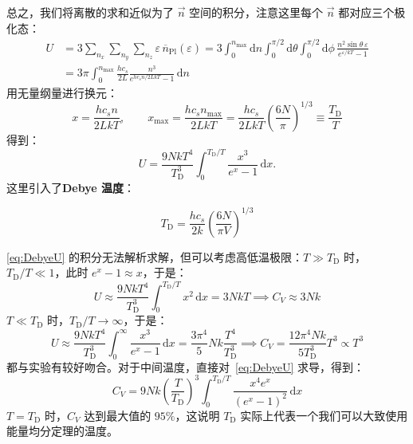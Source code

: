 总之，我们将离散的求和近似为了 $\vec n$ 空间的积分，注意这里每个 $\vec n$ 都对应三个极化态：
\begin{equation}
\begin{split}
    U
    &=3\sum_{n_x}\sum_{n_y}\sum_{n_z}\varepsilon\,\overline n_{\mathrm{Pl}}(\varepsilon)
    =3\int_0^{n_{\max}}\mathrm{d}n\int_0^{\pi/2}\mathrm{d}\theta\int_0^{\pi/2}\mathrm{d}\phi\,\frac{n^2\sin\theta\,\varepsilon}{e^{\varepsilon/kT}-1}\\
    &=3\pi\int_0^{n_{\max}}\frac{hc_s}{2L}\frac{n^3}{e^{hc_sn/2LkT}-1}\,\mathrm{d}n
\end{split}
\end{equation}
用无量纲量进行换元：
\begin{equation}
    x=\frac{hc_sn}{2LkT},
    \qquad
    x_{\max}=\frac{hc_sn_{\max}}{2LkT}
    =\frac{hc_s}{2LkT}\left(\frac{6N}{\pi}\right)^{1/3}\equiv \frac{T_\mathrm{D}}{T}
\end{equation}
得到：
\begin{equation}\label{eq:DebyeU}
    U=\frac{9NkT^4}{T_\mathrm{D}^3}\int_0^{T_\mathrm{D}/T}\frac{x^3}{e^x-1}\,\mathrm{d}x.
\end{equation}
这里引入了\textbf{Debye 温度}：
\begin{definition}[Debye 温度]
    \begin{equation}
        T_\mathrm{D}=\frac{hc_s}{2k}\left(\frac{6N}{\pi V}\right)^{1/3}
    \end{equation}
\end{definition}
\eqref{eq:DebyeU} 的积分无法解析求解，但可以考虑高低温极限：$T\gg T_\mathrm{D}$ 时，$T_\mathrm{D}/T\ll 1$，此时 $e^x-1\approx x$，于是：
\begin{equation}
    U\approx \frac{9NkT^4}{T_\mathrm{D}^3}\int_0^{T_\mathrm{D}/T}x^2\,\mathrm{d}x=3NkT
    \implies
    C_V\approx 3Nk
\end{equation}
$T\ll T_\mathrm{D}$ 时，$T_\mathrm{D}/T\to\infty$，于是：
\begin{equation}
    U\approx \frac{9NkT^4}{T_\mathrm{D}^3}\int_0^{\infty}\frac{x^3}{e^x-1}\,\mathrm{d}x
    =\frac{3\pi^4}{5}Nk\frac{T^4}{T_\mathrm{D}^3}
    \implies
    C_V=\frac{12\pi^4Nk}{5T_\mathrm{D}^3}T^3\propto T^3
\end{equation}
都与实验有较好吻合。对于中间温度，直接对~\eqref{eq:DebyeU} 求导，得到：
\begin{equation}
    C_V=9Nk\left(\frac{T}{T_\mathrm{D}}\right)^3\int_0^{T_\mathrm{D}/T}\frac{x^4e^x}{(e^x-1)^2}\,\mathrm{d}x
\end{equation}
$T=T_\mathrm{D}$ 时，$C_V$ 达到最大值的 $95\%$，这说明 $T_\mathrm{D}$ 实际上代表一个我们可以大致使用能量均分定理的温度。

